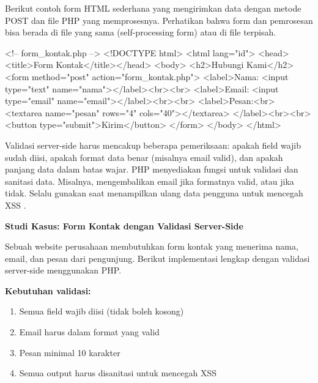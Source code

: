 Berikut contoh form HTML sederhana yang mengirimkan data dengan metode POST dan file PHP yang memprosesnya. Perhatikan bahwa form dan pemrosesan bisa berada di file yang sama (self-processing form) atau di file terpisah.

\begin{webcode}[language=HTML, caption={Form HTML sederhana}]
<!-- form_kontak.php -->
<!DOCTYPE html>
<html lang="id">
<head><title>Form Kontak</title></head>
<body>
  <h2>Hubungi Kami</h2>
  <form method="post" action="form_kontak.php">
    <label>Nama: <input type="text" name="nama"></label><br><br>
    <label>Email: <input type="email" name="email"></label><br><br>
    <label>Pesan:<br>
      <textarea name="pesan" rows="4" cols="40"></textarea>
    </label><br><br>
    <button type="submit">Kirim</button>
  </form>
</body>
</html>
\end{webcode}

Validasi server-side harus mencakup beberapa pemeriksaan: apakah field wajib sudah diisi, apakah format data benar (misalnya email valid), dan apakah panjang data dalam batas wajar. PHP menyediakan fungsi  untuk validasi dan sanitasi data. Misalnya,  mengembalikan email jika formatnya valid, atau  jika tidak. Selalu gunakan  saat menampilkan ulang data pengguna untuk mencegah XSS \cite{owaspXss}.

\begin{contoh}
\textbf{Studi Kasus: Form Kontak dengan Validasi Server-Side}

Sebuah website perusahaan membutuhkan form kontak yang menerima nama, email, dan pesan dari pengunjung. Berikut implementasi lengkap dengan validasi server-side menggunakan PHP.

\textbf{Kebutuhan validasi:}
\begin{enumerate}
  \item Semua field wajib diisi (tidak boleh kosong)
  \item Email harus dalam format yang valid
  \item Pesan minimal 10 karakter
  \item Semua output harus disanitasi untuk mencegah XSS
\end{enumerate}
\end{contoh}


